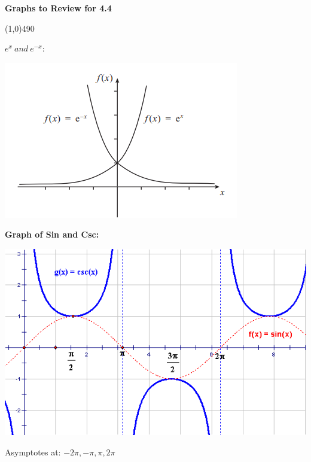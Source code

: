 \documentclass{report}
\begin{document}
  \pagebreak \bigbreak \noindent
  \bigbreak \noindent
  \begin{mdframed}
  \begin{large}
      \begin{center}
          \textbf{Graphs to Review for 4.4}
      \end{center}
  \end{large}
  \end{mdframed}
  \line(1,0){490}
  \bigbreak \noindent \bigbreak
  \begin{mdframed}
    \textbf{$e^{x}\ and\ e^{-x}:$}
    \bigbreak \noindent 
    \begin{center}
      \includegraphics[scale=0.5]{ ./images/8.png }
    \end{center}
  \end{mdframed}

  \bigbreak \noindent 
  \begin{mdframed}
    \textbf{Graph of Sin and Csc:}
    \bigbreak \noindent 
    \begin{center}
      \includegraphics[scale=.5]{ ./images/9.png }
    \end{center}
    \bigbreak \noindent 
    Asymptotes at: $-2\pi, -\pi, \pi, 2\pi $
  \end{mdframed}
\end{document}
